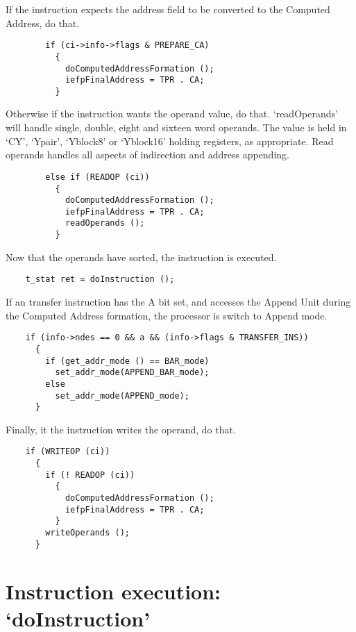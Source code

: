 \documentclass[notitlepage]{report}
\begin{document}
If the instruction expects the address field to be converted to the
Computed Address, do that.

\begin{verbatim}
        if (ci->info->flags & PREPARE_CA)
          {
            doComputedAddressFormation ();
            iefpFinalAddress = TPR . CA;
          }
\end{verbatim}

Otherwise if the instruction wants the operand value, do that. `readOperands' will handle single, double, eight and sixteen word operands. The value is held in `CY', `Ypair', `Yblock8' or `Yblock16' holding registers, as appropriate. Read operands handles all aspects of indirection and address appending.

\begin{verbatim}
        else if (READOP (ci))
          {
            doComputedAddressFormation ();
            iefpFinalAddress = TPR . CA;
            readOperands ();
          }
\end{verbatim}

Now that the operands have sorted, the instruction is executed.

\begin{verbatim}
    t_stat ret = doInstruction ();
\end{verbatim}

If an transfer instruction has the A bit set, and accesses the Append Unit
during the Computed Address formation, the processor is switch to Append
mode.

\begin{verbatim}
    if (info->ndes == 0 && a && (info->flags & TRANSFER_INS))
      {
        if (get_addr_mode () == BAR_mode)
          set_addr_mode(APPEND_BAR_mode);
        else
          set_addr_mode(APPEND_mode);
      }
\end{verbatim}

Finally, it the instruction writes the operand, do that.

\begin{verbatim}
    if (WRITEOP (ci))
      {
        if (! READOP (ci))
          {
            doComputedAddressFormation ();
            iefpFinalAddress = TPR . CA;
          }
        writeOperands ();
      }
\end{verbatim}

\section{Instruction execution: `doInstruction'}
\end{document}
